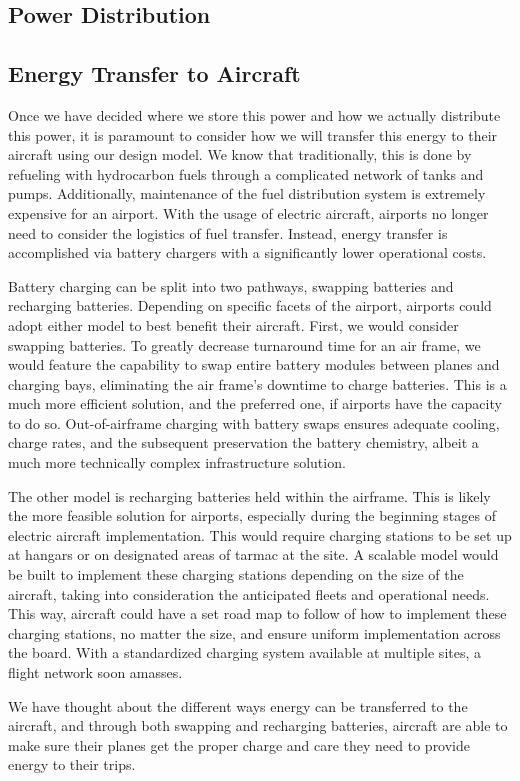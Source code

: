 \documentclass[../main.tex]{subfiles}
\begin{document}
\subsection{Power Distribution} %

\subsection{Energy Transfer to Aircraft} %
Once we have decided where we store this power and how we actually distribute this power, it is paramount to consider how we will transfer this energy to their aircraft using our design model. We know that traditionally, this is done by refueling with hydrocarbon fuels through a complicated network of tanks and pumps. Additionally, maintenance of the fuel distribution system is extremely expensive for an airport. With the usage of electric aircraft, airports no longer need to consider the logistics of fuel transfer. Instead, energy transfer is accomplished via battery chargers with a significantly lower operational costs.\par
Battery charging can be split into two pathways, swapping batteries and recharging batteries. Depending on specific facets of the airport, airports could adopt either model to best benefit their aircraft. First, we would consider swapping batteries. To greatly decrease turnaround time for an air frame, we would feature the capability to swap entire battery modules between planes and charging bays, eliminating the air frame’s downtime to charge batteries. This is a much more efficient solution, and the preferred one, if airports have the capacity to do so. Out-of-airframe charging with battery swaps ensures adequate cooling, charge rates, and the subsequent preservation the battery chemistry, albeit a much more technically complex infrastructure solution.\par
The other model is recharging batteries held within the airframe. This is likely the more feasible solution for airports, especially during the beginning stages of electric aircraft implementation. This would require charging stations to be set up at hangars or on designated areas of tarmac at the site. A scalable model would be built to implement these charging stations depending on the size of the aircraft, taking into consideration the anticipated fleets and operational needs. This way, aircraft could have a set road map to follow of how to implement these charging stations, no matter the size, and ensure uniform implementation across the board. With a standardized charging system available at multiple sites, a flight network soon amasses.\par
We have thought about the different ways energy can be transferred to the aircraft, and through both swapping and recharging batteries, aircraft are able to make sure their planes get the proper charge and care they need to provide energy to their trips. 
\end{document}
